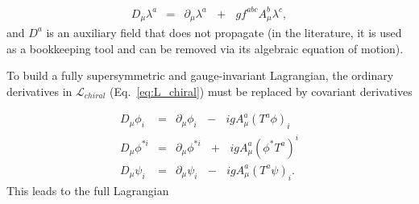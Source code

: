 \documentclass[dissertation.tex]{subfiles}
\begin{document}
\begin{eqnarray}
\label{eq:gaugino_covariant_derivative}
D_{\mu}\lambda^{a} &=& \partial_{\mu}\lambda^{a}\mbox{ }+\mbox{ }gf^{abc}A_{\mu}^{b}\lambda^{c}, 
\end{eqnarray}
%
and $D^{a}$ is an auxiliary field that does not propagate (in the literature, it is used as a bookkeeping tool and can be removed via its algebraic equation of motion).

To build a fully supersymmetric and gauge-invariant Lagrangian, the ordinary derivatives in $\mathcal{L}_{chiral}$ (Eq.~\ref{eq:L_chiral}) must be replaced by covariant derivatives

\begin{eqnarray}
\label{eq:fermion_sfermion_covariant_derivatives}
D_{\mu}\phi_{i} &=& \partial_{\mu}\phi_{i}\mbox{ }-\mbox{ }igA_{\mu}^{a}(T^{a}\phi)_{i}\\
D_{\mu}\phi^{*i} &=& \partial_{\mu}\phi^{*i}\mbox{ }+\mbox{ }igA_{\mu}^{a}(\phi^{*}T^{a})^{i}\\
D_{\mu}\psi_{i} &=& \partial_{\mu}\psi_{i}\mbox{ }-\mbox{ }igA_{\mu}^{a}(T^{a}\psi)_{i}.
\end{eqnarray}
%
This leads to the full Lagrangian
\end{document}
